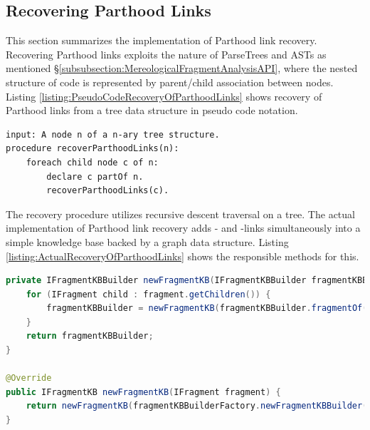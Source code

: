 \subsection{Recovering Parthood Links}
\label{subsection:RecoveringParthoodLinks}
This section summarizes the implementation of \gls{Parthood} link recovery.
Recovering \gls{Parthood} links exploits the nature of \glspl{ParseTree} and \glspl{AST} as mentioned §\ref{subsubsection:MereologicalFragmentAnalysisAPI}, where the nested structure of code is represented by parent/child association between nodes.
Listing \ref{listing:PseudoCodeRecoveryOfParthoodLinks} shows recovery of \gls{Parthood} links from a tree data structure in pseudo code notation.
\begin{lstlisting}[caption={Pseudo code Recovery of Parthood Links},label={listing:PseudoCodeRecoveryOfParthoodLinks},morekeywords={procedure,foreach,input,output}]
input: A node n of a n-ary tree structure.
procedure recoverParthoodLinks(n):
	foreach child node c of n:
		declare c partOf n.
		recoverParthoodLinks(c).	
\end{lstlisting}
The recovery procedure utilizes recursive descent traversal on a tree.
The actual implementation of \gls{Parthood} link recovery adds \partOf- and \fragmentOf-links simultaneously into a simple knowledge base backed by a graph data structure.
Listing \ref{listing:ActualRecoveryOfParthoodLinks} shows the responsible methods for this.
\begin{lstlisting}[language=Java,caption={Actual Recovery of Parthood Links},label={listing:ActualRecoveryOfParthoodLinks}]
private IFragmentKBBuilder newFragmentKB(IFragmentKBBuilder fragmentKBBuilder, IFragment fragment) {
    for (IFragment child : fragment.getChildren()) {
        fragmentKBBuilder = newFragmentKB(fragmentKBBuilder.fragmentOf(child, fragment), child);
    }
    return fragmentKBBuilder;
}

@Override
public IFragmentKB newFragmentKB(IFragment fragment) {
	return newFragmentKB(fragmentKBBuilderFactory.newFragmentKBBuilder(), fragment).build();
}
\end{lstlisting}

